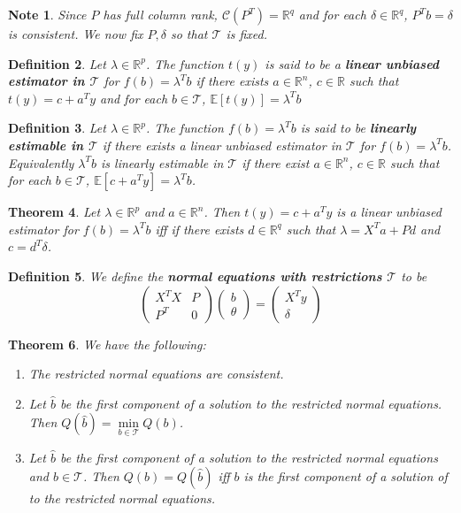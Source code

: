 \documentclass[12pt]{amsart}
\newtheorem{thm}{Theorem}[section]
\newtheorem{defn}[thm]{Definition}
\newtheorem{note}[thm]{Note}
\newcommand{\del}{\delta}
\newcommand{\lam}{\lambda}
\newcommand{\E}{\mathbb{E}}
\newcommand{\R}{\mathbb{R}}
\newcommand{\MC}{\mathcal{C}}
\newcommand{\MT}{\mathcal{T}}
\begin{document}
\begin{note}
Since $P$ has full column rank, $\MC(P^T) = \R^q$ and for each $\del \in \R^q$, $P^Tb = \del$ is consistent. We now fix $P, \del$ so that $\MT$ is fixed.
\end{note}

\begin{defn}
Let $\lam \in \R^p$. The function $t(y)$ is said to be a \textbf{linear unbiased estimator in $\MT$} for $f(b) = \lam^Tb$ if there exists $a \in \R^n$, $c \in \R$ such that $t(y) = c + a^Ty$ and for each $b \in \MT$, $\E[t(y)] = \lam^Tb$
\end{defn}

\begin{defn}
Let $\lam \in \R^p$. The function $f(b) = \lam^Tb$ is said to be \textbf{linearly estimable in $\MT$} if there exists a linear unbiased estimator in $\MT$ for $f(b) = \lam^Tb$. Equivalently $\lam^Tb$ is linearly estimable in $\MT$ if there exist $a \in \R^n$, $c \in \R$ such that for each $b \in \MT$, $\E[c + a^Ty] = \lam^Tb$. 
\end{defn}

\begin{thm}
Let $\lam \in \R^p$ and $a \in \R^n$. Then $t(y) = c+a^Ty$ is a linear unbiased estimator for $f(b) = \lam^Tb$ iff if there exists $d \in \R^q$ such that $\lam = X^Ta + Pd$ and $c = d^T \del$. 
\end{thm}

\begin{defn}
We define the \textbf{normal equations with restrictions $\MT$} to be 
$$\begin{pmatrix}
X^TX & P \\ P^T & 0
\end{pmatrix} 
\begin{pmatrix}
b \\ \theta 
\end{pmatrix} 
=
\begin{pmatrix}
X^Ty \\ \del
\end{pmatrix} $$
\end{defn}

\begin{thm}
We have the following:
\begin{enumerate}
\item The restricted normal equations are consistent. 
\item Let $\hat{b}$ be the first component of a solution to the restricted normal equations. Then $Q(\hat{b}) = \min\limits_{b \in \MT}Q(b)$.
\item Let $\hat{b}$ be the first component of a solution to the restricted normal equations and $b \in \MT$. Then $Q(b) = Q(\hat{b})$ iff $b$ is the first component of a solution of to the restricted normal equations.
\end{enumerate}
\end{thm}
\end{document}

